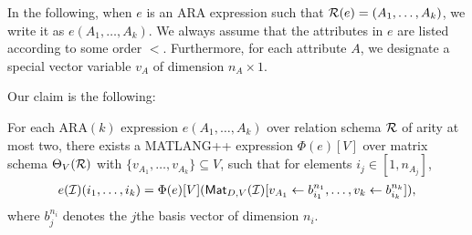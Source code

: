 In the following, when $e$ is an ARA expression such that $\mathcal{R}(e)=(A_1,\ldots,A_k)$, we write it as $e(A_1,\ldots,A_k)$. We always assume that the attributes in $e$ are listed according to some order $<$. Furthermore, for each attribute $A$, we designate a special vector variable $v_A$ of dimension $n_A\times 1$.



Our claim is the following:
\begin{lemma}
For each ARA$(k)$ expression $e(A_1,\ldots,A_k)$ over relation schema $\mathcal{R}$ of arity at most two, there exists a MATLANG++ expression $\Phi(e)[V]$ over  matrix schema $\Theta_V(\mathcal{R})$ with $\{v_{A_1},\ldots,v_{A_k}\}\subseteq V$, such that for elements $i_j\in [1,n_{A_j}]$,
$$
e(\mathcal{I})(i_1,\ldots,i_k)=\Phi(e)[V](\mathsf{Mat}_{D,V}(\mathcal{I})[v_{A_1}\gets b_{i_1}^{n_1},\ldots,v_k\gets b_{i_k}^{n_k}]),
$$
where $b_j^{n_i}$ denotes the $j$the basis vector of dimension $n_i$.
\end{lemma}
